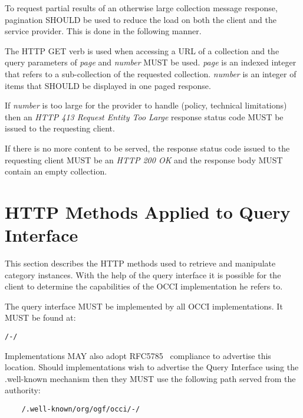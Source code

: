 \documentclass[10pt,a4paper]{article}
\begin{document}
To request partial results of an otherwise large collection message response, pagination SHOULD be used to reduce the load on
both the client and the service provider. This is done in the following manner.

The HTTP GET verb is used when accessing a URL of a collection and the query parameters of {\em page} and {\em number} MUST be used. {\em page} is an indexed
integer that refers to a sub-collection of the requested collection. {\em number} is an integer of items that SHOULD be displayed in one paged response.


If {\em number} is too large for the provider to handle (policy, technical limitations) then an \emph{HTTP 413 Request Entity Too Large} response status code MUST be issued to the requesting client.

If there is no more content to be served, the response status code issued to the requesting client MUST be an \emph{HTTP 200 OK} and the response body MUST contain an empty collection.

\section{HTTP Methods Applied to Query Interface}



This section describes the HTTP methods used to retrieve and manipulate category instances.  With the help of the query interface it is possible for the client to determine the capabilities of the OCCI implementation he refers to.

The query interface MUST be implemented by all OCCI implementations. It MUST be found at:

\begin{verbatim}
/-/
\end{verbatim}

Implementations MAY also adopt RFC5785~\cite{rfc5785} compliance to advertise this location. Should implementations wish to advertise the Query Interface using the .well-known mechanism then they MUST use the following path served from the authority:

\begin{verbatim}
	/.well-known/org/ogf/occi/-/
\end{verbatim}
\end{document}
